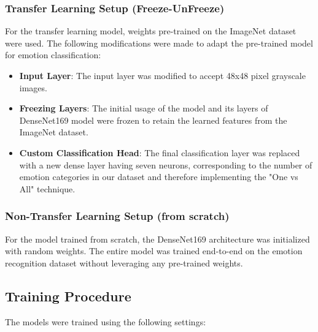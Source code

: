 \documentclass[conference]{IEEEtran}
\begin{document}
\subsubsection{Transfer Learning Setup (Freeze-UnFreeze)}
For the transfer learning model, weights pre-trained on the ImageNet dataset were used. The following modifications were made to adapt the pre-trained model for emotion classification:

\begin{itemize}
    \item \textbf{Input Layer}: The input layer was modified to accept 48x48 pixel grayscale images.
    \item \textbf{Freezing Layers}: The initial usage of the model and its layers of DenseNet169 model were frozen to retain the learned features from the ImageNet dataset.
    \item \textbf{Custom Classification Head}: The final classification layer was replaced with a new dense layer having seven neurons, corresponding to the number of emotion categories in our dataset and therefore implementing the "One vs All" technique.
\end{itemize}

\subsubsection{Non-Transfer Learning Setup (from scratch)}
For the model trained from scratch, the DenseNet169 architecture was initialized with random weights. The entire model was trained end-to-end on the emotion recognition dataset without leveraging any pre-trained weights.


\subsection{Training Procedure}
The models were trained using the following settings:
\end{document}

